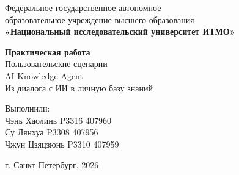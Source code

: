 \begin{titlepage}
    \centering
    Федеральное государственное автономное\\
    образовательное учреждение высшего образования\\
    \textbf{«Национальный исследовательский университет ИТМО»}\\

    \vfill

    \textbf{Практическая работа}\\
    \vspace{0.5\baselineskip}
    Пользовательские сценарии\\
    \vspace{0.5\baselineskip}
    AI Knowledge Agent\\
    \vspace{0.5\baselineskip}
    Из диалога с ИИ в личную базу знаний

    \vfill

    \begin{flushright}
    Выполнили:\\
    Чэнь Хаолинь P3316 407960\\
    Су Лянхуа P3308 407956\\
    Чжун Цзяцзюнь P3310 407959
    \end{flushright}

    \vspace{4\baselineskip}
    \centering
    г. Санкт-Петербург, 2026
\end{titlepage}
